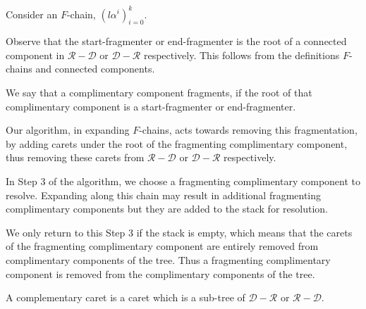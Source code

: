 \documentclass[12pt]{amsart}
\newcommand{\D}{\mathcal{D}}
\newcommand{\R}{\mathcal{R}}
\begin{document}
\begin{remark}
Consider an $F$-chain, $(l \alpha^i)_{i=0}^k$. 

Observe that the start-fragmenter or end-fragmenter is the root of a connected component in $\R-\D$ or $\D-\R$ respectively. This follows from the definitions $F$-chains and connected components.

We say that a complimentary component fragments, if the root of that complimentary component is a start-fragmenter or end-fragmenter.

Our algorithm, in expanding $F$-chains, acts towards removing this fragmentation, by adding carets under the root of the fragmenting complimentary component, thus removing these carets from $\R-\D$ or $\D-\R$ respectively.

In Step 3 of the algorithm, we choose a fragmenting complimentary component to resolve. Expanding along this chain may result in additional fragmenting complimentary components but they are added to the stack for resolution.

We only return to this Step 3 if the stack is empty, which means that the carets of the fragmenting complimentary component are entirely removed from complimentary components of the tree. Thus a fragmenting complimentary component is removed from the complimentary components of the tree.
\end{remark}

\begin{definition}
    A complementary caret is a caret which is a sub-tree of $\D - \R$ or $\R - \D$.
    
\end{definition}
\end{document}
